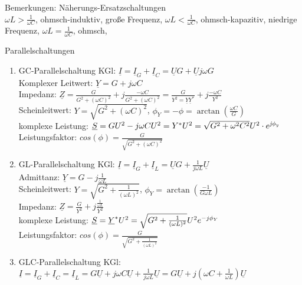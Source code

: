 \documentclass[german]{article}
\begin{document}
Bemerkungen: Näherungs-Ersatzschaltungen \\
$\omega L > \frac1{\omega C}$, ohmsch-induktiv, große Frequenz, %
$\omega L < \frac1{\omega C}$, ohmsch-kapazitiv, niedrige Frequenz, %
$\omega L = \frac1{\omega C}$, ohmsch, %

Parallelschaltungen
\begin{enumerate}
	\item GC-Parallelschaltung 
		KGl: $\underline{I} = \underline{I}_G + \underline{I}_C = \underline{U} G + \underline{U} j \omega G$ \\
		Komplexer Leitwert: $\underline{Y} = G + j \omega C$ \\
		Impedanz: $\underline{Z} = \frac{G}{G^2 + ( \omega C )^2} + j \frac{- \omega C}{G^2 + (\omega C)^2} = \frac{G}{Y^2 = \underline{Y}\underline{Y}^*} + j \frac{- \omega C}{Y^2}$ \\
		Scheinleitwert: $Y = \sqrt{G^2 + (\omega C)^2}$, $\phi_Y = - \phi = \arctan\left( \frac{\omega C}{G} \right)$ \\
		komplexe Leistung: $\underline{S} = GU^2 - j\omega C U^2 = Y^{\it *} U^2 = \sqrt{G^2 + \omega^2 C^2} U^2 \cdot e^{\it j\phi_y}$ %
		Leistungsfaktor: $cos(\phi) = \frac{G}{\sqrt{G^2 + (\omega C)^2}}$
	\item GL-Parallelschaltung
		KGl: $\underline{I} = \underline{I}_G + \underline{I}_L = \underline{U}G + \frac1{j\omega L} \underline{U}$ \\
		Admittanz: $\underline{Y} = G - j \frac1{\omega L}$ \\
		Scheinleitwert: $Y = \sqrt{G^2 + \frac1{(\omega L)^2}}$, $\phi_Y = \arctan\left( \frac{-1}{G\omega L} \right)$ \\
		Impedanz: $\underline{Z} = \frac{G}{Y^2} + j \frac{\frac1{\omega L}}{Y^2}$ \\
		komplexe Leistung: $\underline{S} = \underline{Y}^{\it *} U^2 = \sqrt{G^2 + \frac1{(\omega L)^2}} U^2 e^{{\it -}j\phi_Y}$ \\
		Leistungsfaktor: $cos(\phi) = \frac{G}{\sqrt{G^2 + \frac1{(\omega L)^2}}}$
	\item GLC-Parallelschaltung
		KGl: $\underline{I} = \underline{I}_G + \underline{I}_C = \underline{I}_L = G \underline{U} + j \omega C \underline{U} + \frac1{j \omega L} \underline{U} = G\underline{U} + j \left(\omega C + \frac1{\omega L}\right)\underline{U}$ \\

\end{enumerate}
\end{document}
